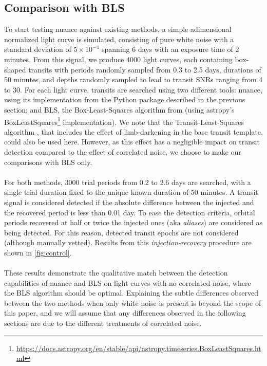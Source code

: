 \documentclass[modern,linenumbers]{aastex631}
\newcommand{\nuancecode}{\textsf{nuance}}
\newcommand{\review}[1]{#1}
\newcommand{\footlink}[1]{\footnote{\url{#1}}}
\begin{document}
\subsection{Comparison with BLS}\label{control}

To start testing \nuancecode{} against existing methods, a simple adimensional normalized light curve is simulated, consisting of pure white noise with a standard deviation of $5\times 10^{-4}$ spanning 6 days with an exposure time of 2 minutes.
From this signal, we produce 4000 light curves, each containing box-shaped transits with periods randomly sampled from 0.3 to 2.5 days, durations of 50 minutes, and depths randomly sampled to lead to transit SNRs ranging from 4 to 30.
For each light curve, transits are searched using two different tools: \textsf{nuance}, using its implementation from the Python package described in the previous section; and BLS, the Box-Least-Squares algorithm from \cite{bls} (using \textsf{astropy}'s \textsf{BoxLeastSquares}\footlink{https://docs.astropy.org/en/stable/api/astropy.timeseries.BoxLeastSquares.html} implementation). \review{We note that the Transit-Least-Squares algorithm \citep{tls}, that includes the effect of limb-darkening in the base transit template, could also be used here. However, as this effect has a negligible impact on transit detection compared to the effect of correlated noise, we choose to make our comparisons with BLS only.}\\\\
For both methods, 3000 trial periods from 0.2 to 2.6 days are searched, with a single trial duration fixed to the unique known duration of 50 minutes. A transit signal is considered detected if the absolute difference between the injected and the recovered period is less than 0.01 day. To ease the detection criteria, orbital periods recovered at half or twice the injected ones (aka \textit{aliases}) are considered as being detected. For this reason, detected transit epochs are not considered (although manually vetted). Results from this \textit{injection-recovery} procedure are shown in \autoref{fig:control}.\\\\
These results demonstrate the qualitative match between the detection capabilities of \textsf{nuance} and \textsf{BLS} on light curves with no correlated noise, where the BLS algorithm should be optimal. Explaining the subtle differences observed between the two methods when only white noise is present is beyond the scope of this paper, and we will assume that any differences observed in the following sections are due to the different treatments of correlated noise.
\end{document}
